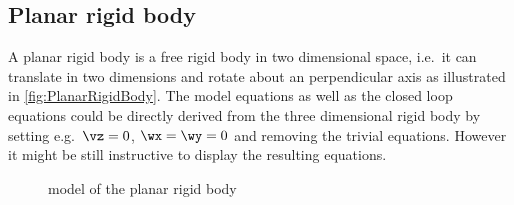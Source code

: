 \subsection{Planar rigid body}\label{sec:CtrlPlanarRigidBody}
A planar rigid body is a free rigid body in two dimensional space, i.e.\ it can translate in two dimensions and rotate about an perpendicular axis as illustrated in \autoref{fig:PlanarRigidBody}.
The model equations as well as the closed loop equations could be directly derived from the three dimensional rigid body by setting e.g.\ $\vz=0$, $\wx=\wy=0$ and removing the trivial equations.
However it might be still instructive to display the resulting equations.

\begin{figure}[ht]
 \centering
 
 \caption{model of the planar rigid body}
 \label{fig:PlanarRigidBody}
\end{figure}

